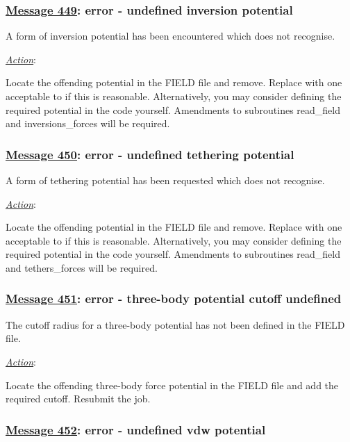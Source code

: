 \subsubsection*{\underline{Message 449}: error - undefined inversion potential}

A form of inversion potential has been
encountered which \D does not recognise.

\noindent \underline{\em Action}:

Locate the offending potential in the FIELD file and remove.
Replace with one acceptable to \D if this is reasonable.
Alternatively, you may consider defining the required potential in
the code yourself. Amendments to subroutines {\sc read\_field} and
{\sc inversions\_forces} will be required.

\subsubsection*{\underline{Message 450}: error - undefined tethering potential}

A form of tethering potential has been
requested which \D does not recognise.

\noindent \underline{\em Action}:

Locate the offending potential in the FIELD file and remove.
Replace with one acceptable to \D if this is reasonable.
Alternatively, you may consider defining the required potential in
the code yourself.  Amendments to subroutines {\sc read\_field}
and {\sc tethers\_forces} will be required.

\subsubsection*{\underline{Message 451}: error - three-body potential cutoff undefined}

The cutoff radius for a three-body
potential has not been defined in the
FIELD file.

\noindent \underline{\em Action}:

Locate the offending three-body force potential in the FIELD file
and add the required cutoff.  Resubmit the job.

\subsubsection*{\underline{Message 452}: error - undefined vdw potential}

